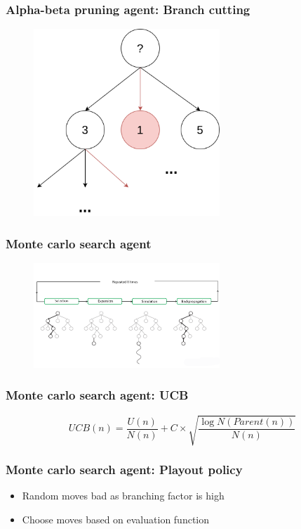 \documentclass{beamer}
\begin{document}
\begin{frame}
	\frametitle{Alpha-beta pruning agent: Branch cutting}
	\begin{figure}
		\centering
		\includegraphics[width=7cm, keepaspectratio]{branch_cutting.png}
	\end{figure}
\end{frame}

\begin{frame}
	\frametitle{Monte carlo search agent}
	\begin{figure}
		\centering
		\includegraphics[width=7cm, keepaspectratio]{mcts_algo.png}
	\end{figure}
\end{frame}

\begin{frame}
	\frametitle{Monte carlo search agent: UCB}
	$$
		UCB(n) = \frac{U(n)}{N(n)} + C \times \sqrt{\frac{\log{N(Parent(n))}}{N(n)}}
	$$
\end{frame}
\begin{frame}
	\frametitle{Monte carlo search agent: Playout policy}
	\begin{itemize}
		\item Random moves bad as branching factor is high
		\item Choose moves based on evaluation function
	\end{itemize}
\end{frame}
\end{document}
